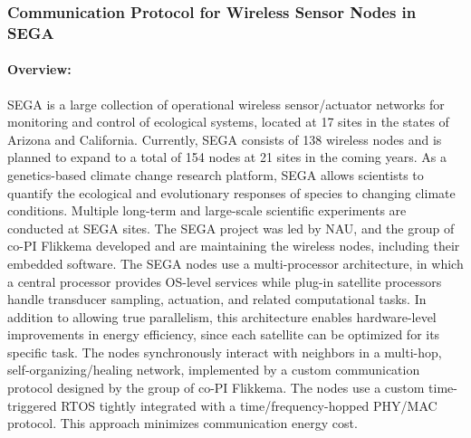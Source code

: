\subsubsection{Communication Protocol for Wireless Sensor Nodes in SEGA}
\label{sec:sega-case-study}

\paragraph{Overview:}

SEGA is a large collection of operational wireless sensor/actuator networks for monitoring and control of ecological systems, located at 17 sites in the states of Arizona and California.
Currently, SEGA consists of 138 wireless nodes and is planned to expand to a total of 154 nodes at 21 sites in the coming years.
As a genetics-based climate change research platform, SEGA allows scientists to quantify the ecological and evolutionary responses of species to changing climate conditions.
Multiple long-term and large-scale scientific experiments are conducted at SEGA sites.
The SEGA project was led by NAU, and the group of co-PI Flikkema developed and are maintaining the wireless nodes, including their embedded software.
%
The SEGA nodes use a multi-processor architecture, in which a central processor provides OS-level services %
while plug-in satellite processors handle transducer sampling, actuation, and related computational tasks.
In addition to allowing true parallelism, this architecture enables hardware-level improvements in energy efficiency, since each satellite can be optimized for its specific task.
%
The nodes synchronously interact with neighbors in a multi-hop, self-organizing/healing network, implemented by a custom communication protocol designed by the group of co-PI Flikkema. %
The nodes use a custom time-triggered RTOS tightly integrated with a time/frequency-hopped PHY/MAC protocol.
This approach %
minimizes communication energy cost.
